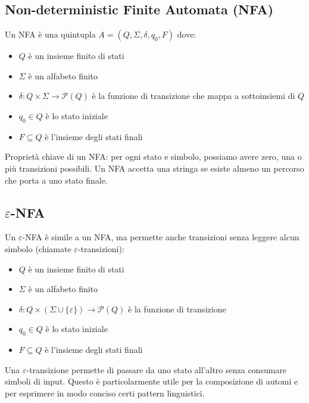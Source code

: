 \documentclass[12pt,a4paper]{article}
\newcommand{\powerset}{\mathcal{P}}
\begin{document}
\subsection{Non-deterministic Finite Automata (NFA)}

Un NFA è una quintupla $A = (Q, \Sigma, \delta, q_0, F)$ dove:
\begin{itemize}
  \item $Q$ è un insieme finito di stati
  \item $\Sigma$ è un alfabeto finito
  \item $\delta: Q \times \Sigma \rightarrow \powerset(Q)$ è la funzione di transizione che mappa a sottoinsiemi di $Q$
  \item $q_0 \in Q$ è lo stato iniziale
  \item $F \subseteq Q$ è l'insieme degli stati finali
\end{itemize}

\begin{concettochiave}
Proprietà chiave di un NFA: per ogni stato e simbolo, possiamo avere zero, una o più transizioni possibili. Un NFA accetta una stringa se esiste almeno un percorso che porta a uno stato finale.
\end{concettochiave}

\subsection{$\varepsilon$-NFA}

Un $\varepsilon$-NFA è simile a un NFA, ma permette anche transizioni senza leggere alcun simbolo (chiamate $\varepsilon$-transizioni):
\begin{itemize}
  \item $Q$ è un insieme finito di stati
  \item $\Sigma$ è un alfabeto finito
  \item $\delta: Q \times (\Sigma \cup \{\varepsilon\}) \rightarrow \powerset(Q)$ è la funzione di transizione
  \item $q_0 \in Q$ è lo stato iniziale
  \item $F \subseteq Q$ è l'insieme degli stati finali
\end{itemize}

\begin{concettochiave}
Una $\varepsilon$-transizione permette di passare da uno stato all'altro senza consumare simboli di input. Questo è particolarmente utile per la composizione di automi e per esprimere in modo conciso certi pattern linguistici.
\end{concettochiave}
\end{document}
